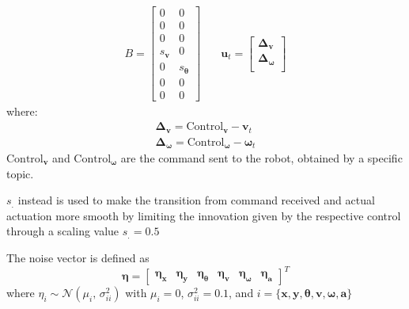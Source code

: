 \begin{align}
B
=
    \begin{bmatrix}
    0 & 0 \\
    0 & 0\\
    0 & 0\\
    s_\mathbf{v} & 0\\
    0 & s_{ \dot{\boldsymbol \theta}}\\
    0 & 0\\
    0 & 0
    \end{bmatrix}
& \quad
\mathbf{u}_t
=
    \begin{bmatrix}
    \boldsymbol \Delta_{\mathbf{v}}  \\
    \boldsymbol \Delta_{ \boldsymbol \omega} \\[0.3em]
    \end{bmatrix}
\end{align}
where:
  \begin{align}
     \boldsymbol \Delta_{\mathbf{v}} = \text{Control}_{\mathbf{v}} - \mathbf{v}_t  \\
    \boldsymbol \Delta_{\boldsymbol \omega} = \text{Control}_{\boldsymbol \omega} - \boldsymbol \omega_t
  \end{align}
$ \text{Control}_{\mathbf{v}}$ and  $\text{Control}_{\boldsymbol \omega}$ are the command sent to the robot, obtained by a specific topic.

$s_{.}$ instead is used to make the transition from command received and actual actuation more smooth by limiting the innovation given by the respective control through a scaling value $s_. = 0.5$



The noise vector is defined as
\begin{equation}
\boldsymbol \eta
=
\begin{bmatrix}
\boldsymbol \eta_{\mathbf{x}}  &
\boldsymbol \eta_{\mathbf{y}} &
\boldsymbol \eta_{\boldsymbol \theta}  &
\boldsymbol \eta_{\mathbf{v}} &
\boldsymbol \eta_{\boldsymbol \omega} &
\boldsymbol \eta_{\mathbf{a}}
\end{bmatrix} ^T
\end{equation}
where $\eta_i \sim \mathcal{N}(\mu_i,\,\sigma_{ii}^{2})$ with $\mu_i = 0$, $\sigma_{ii}^2 = 0.1$, and $ i = \{ \mathbf{x} , \mathbf{y} , \boldsymbol \theta , \mathbf{v} , \boldsymbol \omega , \mathbf{a} \}$

